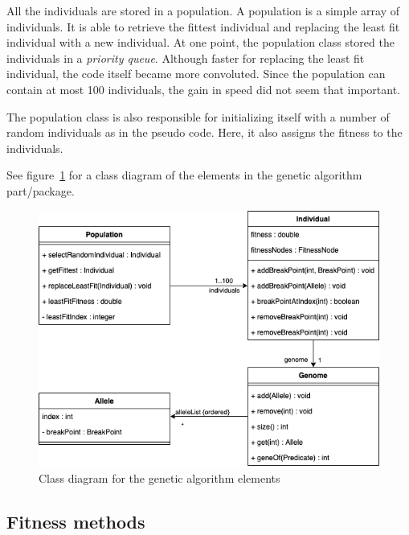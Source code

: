 All the individuals are stored in a population. A population is a simple array
of individuals. It is able to retrieve the fittest individual and replacing the
least fit individual with a new individual. At one point, the population class
stored the individuals in a \textit{priority queue}. Although faster for
replacing the least fit individual, the code itself became more convoluted.
Since the population can contain at most 100 individuals, the gain in speed did
not seem that important. 

The population class is also responsible for initializing itself with a number
of random individuals as in the pseudo code. Here, it also assigns the fitness
to the individuals. 

See figure~\ref{fig:class-diagram-ga} for a class diagram of the elements in the
genetic algorithm part/package. 

\begin{figure}[ht]
    \centering
    \includegraphics[width=.8\textwidth]{fig/class-diagram-ga.png}
    \caption{Class diagram for the genetic algorithm elements}
    \label{fig:class-diagram-ga}
\end{figure}


\subsection{Fitness methods} \label{sec:fitness-methods}

